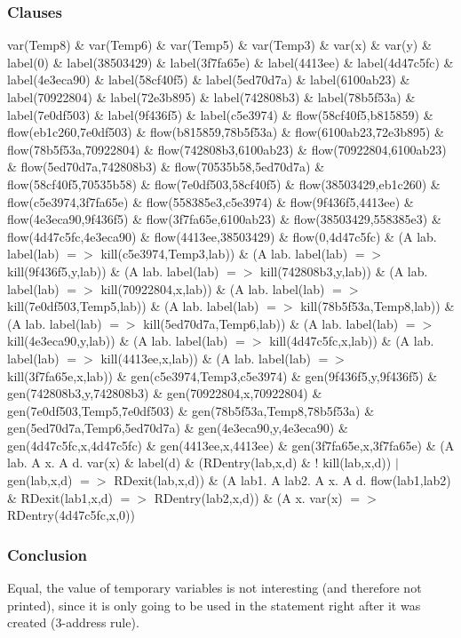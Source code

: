 \subsubsection{Clauses}
var(Temp8) \& var(Temp6) \& var(Temp5) \& var(Temp3) \& var(x) \& var(y) \& 
label(0) \& label(38503429) \& label(3f7fa65e) \& label(4413ee) \& label(4d47c5fc) \& label(4e3eca90) \& label(58cf40f5) \& label(5ed70d7a) \& label(6100ab23) \& label(70922804) \& label(72e3b895) \& label(742808b3) \& label(78b5f53a) \& label(7e0df503) \& label(9f436f5) \& label(c5e3974) \& 
flow(58cf40f5,b815859) \& flow(eb1c260,7e0df503) \& flow(b815859,78b5f53a) \& flow(6100ab23,72e3b895) \& flow(78b5f53a,70922804) \& flow(742808b3,6100ab23) \& flow(70922804,6100ab23) \& flow(5ed70d7a,742808b3) \& flow(70535b58,5ed70d7a) \& flow(58cf40f5,70535b58) \& flow(7e0df503,58cf40f5) \& flow(38503429,eb1c260) \& flow(c5e3974,3f7fa65e) \& flow(558385e3,c5e3974) \& flow(9f436f5,4413ee) \& flow(4e3eca90,9f436f5) \& flow(3f7fa65e,6100ab23) \& flow(38503429,558385e3) \& flow(4d47c5fc,4e3eca90) \& flow(4413ee,38503429) \& flow(0,4d47c5fc) \& 
(A lab. label(lab) $=>$ kill(c5e3974,Temp3,lab)) \& (A lab. label(lab) $=>$ kill(9f436f5,y,lab)) \& (A lab. label(lab) $=>$ kill(742808b3,y,lab)) \& (A lab. label(lab) $=>$ kill(70922804,x,lab)) \& (A lab. label(lab) $=>$ kill(7e0df503,Temp5,lab)) \& (A lab. label(lab) $=>$ kill(78b5f53a,Temp8,lab)) \& (A lab. label(lab) $=>$ kill(5ed70d7a,Temp6,lab)) \& (A lab. label(lab) $=>$ kill(4e3eca90,y,lab)) \& (A lab. label(lab) $=>$ kill(4d47c5fc,x,lab)) \& (A lab. label(lab) $=>$ kill(4413ee,x,lab)) \& (A lab. label(lab) $=>$ kill(3f7fa65e,x,lab)) \& 
gen(c5e3974,Temp3,c5e3974) \& gen(9f436f5,y,9f436f5) \& gen(742808b3,y,742808b3) \& gen(70922804,x,70922804) \& gen(7e0df503,Temp5,7e0df503) \& gen(78b5f53a,Temp8,78b5f53a) \& gen(5ed70d7a,Temp6,5ed70d7a) \& gen(4e3eca90,y,4e3eca90) \& gen(4d47c5fc,x,4d47c5fc) \& gen(4413ee,x,4413ee) \& gen(3f7fa65e,x,3f7fa65e) \& 
(A lab. A x. A d. var(x) \& label(d) \& (RDentry(lab,x,d) \& ! kill(lab,x,d)) $|$ gen(lab,x,d) $=>$ RDexit(lab,x,d)) \& 
(A lab1. A lab2. A x. A d. flow(lab1,lab2) \& RDexit(lab1,x,d) $=>$ RDentry(lab2,x,d)) \& 
(A x. var(x) $=>$ RDentry(4d47c5fc,x,0))
\subsubsection{Conclusion}
Equal, the value of temporary variables is not interesting (and therefore not printed), since it is only going to be used in the statement right after it was created (3-address rule).

